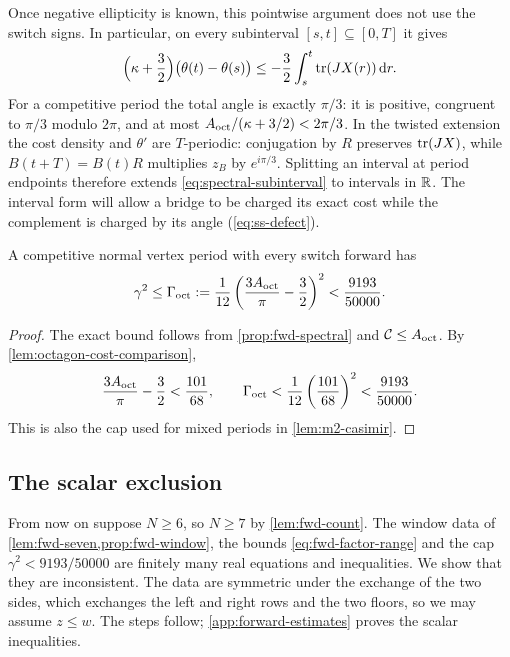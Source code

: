 Once negative ellipticity is known, this pointwise argument does not use the switch signs.
In particular, on every subinterval $[s,t]\subseteq[0,T]$ it gives
\begin{equation}\label{eq:spectral-subinterval}
  \Bigl(\kappa+\frac32\Bigr)\bigl(\theta(t)-\theta(s)\bigr)
  \le-\frac32\int_s^t\operatorname{tr}(JX(r))\,\mathrm{d} r.
\end{equation}
For a competitive period the total angle is exactly $\pi/3$: it is positive, congruent to
$\pi/3$ modulo $2\pi$, and at most $A_{\mathrm{oct}}/(\kappa+3/2)<2\pi/3$.
In the twisted extension the cost density and $\theta'$ are $T$-periodic: conjugation by $R$
preserves $\operatorname{tr}(JX)$, while $B(t+T)=B(t)R$ multiplies $z_B$ by $e^{i\pi/3}$.
Splitting an interval at period endpoints therefore extends \eqref{eq:spectral-subinterval}
to intervals in $\mathbb{R}$.
The interval form will allow a bridge to be charged its exact cost while the complement is
charged by its angle (\cref{eq:ss-defect}).

\begin{corollary}\label{cor:fwd-cap}
A competitive normal vertex period with every switch forward has
\[
 \gamma^2\le\Gamma_{\rm oct}:=
 \frac1{12}\left(\frac{3A_{\mathrm{oct}}}{\pi}-\frac32\right)^2
 <\frac{9193}{50000}.
\]
\end{corollary}

\begin{proof}
The exact bound follows from \cref{prop:fwd-spectral} and $\mathcal{C}\le A_{\mathrm{oct}}$.
By \cref{lem:octagon-cost-comparison},
\[
 \frac{3A_{\mathrm{oct}}}{\pi}-\frac32<\frac{101}{68},\qquad
 \Gamma_{\rm oct}<\frac1{12}\left(\frac{101}{68}\right)^2
 <\frac{9193}{50000}.
\]
This is also the cap used for mixed periods in \cref{lem:m2-casimir}.
\end{proof}

\subsection{The scalar exclusion}

From now on suppose $N\ge6$, so $N\ge7$ by \cref{lem:fwd-count}. The window data of
\cref{lem:fwd-seven,prop:fwd-window}, the bounds \eqref{eq:fwd-factor-range} and the cap
$\gamma^2<9193/50000$ are finitely many real equations and inequalities. We show that they are
inconsistent. The data are symmetric under the
exchange of the two sides, which exchanges the left and right rows and the two floors, so we may
assume $z\le w$. The steps follow; \cref{app:forward-estimates} proves the scalar inequalities.

